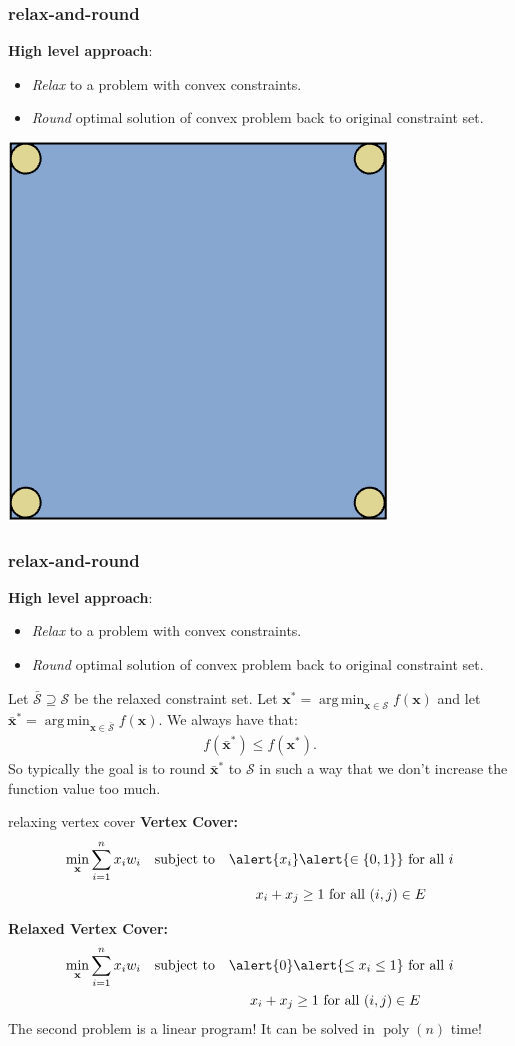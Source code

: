 \documentclass[compress]{beamer}
\newcommand{\bv}[1]{\mathbf{#1}}
\DeclareMathOperator*{\argmin}{arg\,min}
\DeclareMathOperator{\poly}{poly}
\begin{document}
\begin{frame}[t]
	\frametitle{relax-and-round}
	\textbf{High level approach}: 
	\begin{itemize}
		\item \emph{Relax} to a problem with convex constraints. 
		\item \emph{Round} optimal solution of convex problem back to original constraint set.
	\end{itemize}
	\begin{center}
		\includegraphics[width=.4\textwidth]{relaxround2.png}
	\end{center}
\end{frame}

\begin{frame}[t]
	\frametitle{relax-and-round}
	\textbf{High level approach}: 
	\begin{itemize}
		\item \emph{Relax} to a problem with convex constraints. 
		\item \emph{Round} optimal solution of convex problem back to original constraint set.
	\end{itemize}
Let $\bar{\mathcal{S}} \supseteq \mathcal{S}$ be the relaxed constraint set. Let $\bv{x}^* = \argmin_{\bv{x}\in \mathcal{S}} f(\bv{x})$ and let $\bar{\bv{x}}^* = \argmin_{\bv{x}\in \bar{\mathcal{S}}} f(\bv{x})$. We always have that:
\begin{align*}
	f(\bar{\bv{x}}^*) \leq f(\bv{x}^*). 
\end{align*}
So typically the goal is to round $\bar{\bv{x}}^*$ to $\mathcal{S}$ in such a way that we don't increase the function value too much.
\end{frame}

\begin{frame}[t]{relaxing vertex cover}
\textbf{Vertex Cover:}
	\begin{align*}
		\min_{\bv{x}} &\sum_{i=1}^n x_i w_i & &\text{subject to} & \alert{x_i} &\alert{\in \{0,1\}} \text{ for all $i$}\\
		&&&& x_i + x_j &\geq 1 \text{ for all } (i,j) \in E
	\end{align*}

\textbf{Relaxed Vertex Cover:}
\begin{align*}
	\min_{\bv{x}} &\sum_{i=1}^n x_i w_i & &\text{subject to} & \alert{0} &\alert{\leq x_i \leq 1} \text{ for all $i$}\\
	&&&& x_i + x_j &\geq 1 \text{ for all } (i,j) \in E
\end{align*}
The second problem is a linear program! It can be solved in $\poly(n)$ time! 
\end{frame}
\end{document}
